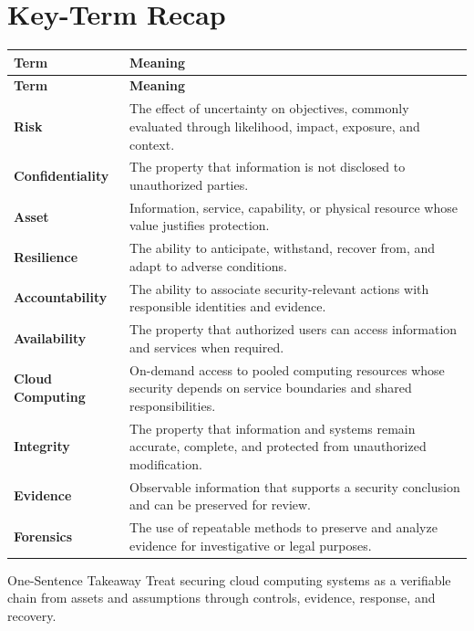 \documentclass[11pt,letterpaper]{article}
\begin{document}
\section*{Key-Term Recap}
\begin{longtable}{>{\raggedright\arraybackslash}p{}>{\raggedright\arraybackslash}p{}}
\toprule\rowcolor{Navy}\color{white}\textbf{Term} & \color{white}\textbf{Meaning}\\\midrule
\endfirsthead
\toprule\rowcolor{Navy}\color{white}\textbf{Term} & \color{white}\textbf{Meaning}\\\midrule
\endhead
\textbf{Risk} & The effect of uncertainty on objectives, commonly evaluated through likelihood, impact, exposure, and context. \\\midrule
\textbf{Confidentiality} & The property that information is not disclosed to unauthorized parties. \\\midrule
\textbf{Asset} & Information, service, capability, or physical resource whose value justifies protection. \\\midrule
\textbf{Resilience} & The ability to anticipate, withstand, recover from, and adapt to adverse conditions. \\\midrule
\textbf{Accountability} & The ability to associate security-relevant actions with responsible identities and evidence. \\\midrule
\textbf{Availability} & The property that authorized users can access information and services when required. \\\midrule
\textbf{Cloud Computing} & On-demand access to pooled computing resources whose security depends on service boundaries and shared responsibilities. \\\midrule
\textbf{Integrity} & The property that information and systems remain accurate, complete, and protected from unauthorized modification. \\\midrule
\textbf{Evidence} & Observable information that supports a security conclusion and can be preserved for review. \\\midrule
\textbf{Forensics} & The use of repeatable methods to preserve and analyze evidence for investigative or legal purposes. \\\midrule
\bottomrule
\end{longtable}
\begin{CornellExamBox}{One-Sentence Takeaway}
Treat securing cloud computing systems as a verifiable chain from assets and assumptions through controls, evidence, response, and recovery.
\end{CornellExamBox}
\end{document}
